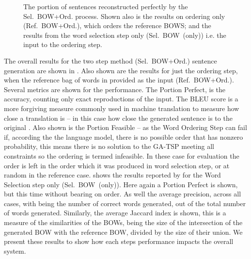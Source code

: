 \documentclass[11pt]{article}
\theoremstyle{plain}
\theoremstyle{definition}
\newcommand{\oracletitle}{Ref.~BOW+Ord.}
\newcommand{\selectiontitle}{Sel.~BOW~(only)}
\newcommand{\twosteptitle}{Sel.~BOW+Ord.}
\begin{document}
\begin{figure}
	\centering
	 {\ordlenscoresoracle}
	\caption{The portion of sentences reconstructed perfectly by the \twosteptitle{} process. Shown also is the results on ordering only (\oracletitle{}), which orders the reference BOWS; and the results from the word selection step only (\selectiontitle{}) i.e. the input to the ordering step.}
	\label{figure:exactlenscore}
\end{figure}




The overall results for the two step method (\twosteptitle{}) sentence generation are shown in . Also shown are the results for just the ordering step, when the reference bag of words in provided as the input (\oracletitle{}). Several metrics are shown for the performance. The Portion Perfect, is the accuracy, counting only exact reproductions of the input. The BLEU score is a more forgiving measure commonly used in machine translation to measure how close a translation is -- in this case how close the generated sentence is to the original \cite{Papineni2002}. Also shown is the Portion Feasible -- as the Word Ordering Step can fail if, according the the language model, there is no possible order that has nonzero probability, this means there is no solution to the GA-TSP meeting all constraints so the ordering is termed infeasible. In these case for evaluation the order is left in the order which it was produced in word selection step, or at random in the reference case.
 shows the results reported by \cite{White2015BOWgen} for the Word Selection step only (\selectiontitle{}). Here again a Portion Perfect is shown, but this time without bearing on order. As well the average precision, across all cases, with being the number of correct words generated, out of the total number of words generated. Similarly, the average Jaccard index is shown, this is a measure of the similarities of the BOWs, being the size of the intersection of the generated BOW with the reference BOW, divided by the size of their union. We present these results to show how each steps performance impacts the overall system.
\end{document}
